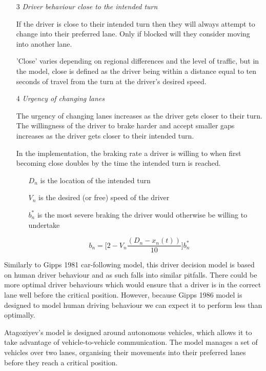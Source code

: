 \begin{enumerate}
\item[3] \textit{Driver behaviour close to the intended turn}

If the driver is close to their intended turn then they will always attempt to change into their preferred lane. Only if blocked will they consider moving into another lane. 

'Close' varies depending on regional differences and the level of traffic, but in the model, close is defined as the driver being within a distance equal to ten seconds of travel from the turn at the driver's desired speed.

\item[4] \textit{Urgency of changing lanes}

The urgency of changing lanes increases as the driver gets closer to their turn. The willingness of the driver to brake harder and accept smaller gaps increases as the driver gets closer to their intended turn.

In the implementation, the braking rate a driver is willing to when first becoming close doubles by the time the intended turn is reached. 

\begin{itemize}
\item[$D_n$] is the location of the intended turn
\item[$V_n$] is the desired (or free) speed of the driver
\item[$b_n^*$] is the most severe braking the driver would otherwise be willing to undertake
\end{itemize}

\begin{equation}
b_n = \Biggl[2 - V_n\frac{(D_n - x_n(t))}{10}\Biggr]b_n^*
\end{equation}

\end{enumerate}

Similarly to Gipps 1981 car-following model, this driver decision model is based on human driver behaviour and as such falls into similar pitfalls. There could be more optimal driver behaviours which would ensure that a driver is in the correct lane well before the critical position. However, because Gipps 1986 model is designed to model human driving behaviour we can expect it to perform less than optimally.

Atagoziyev's model is designed around autonomous vehicles, which allows it to take advantage of vehicle-to-vehicle communication. The model manages a set of vehicles over two lanes, organising their movements into their preferred lanes before they reach a critical position.

